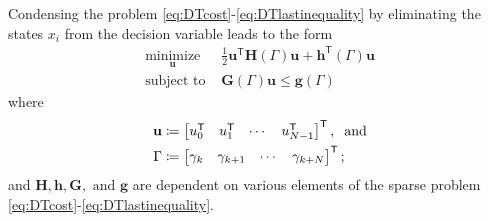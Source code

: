 \documentclass[letterpaper, 10 pt, conference]{ieeeconf}  %
\newcommand{\tran}{^{\mathsf{T}}}
\newcommand{\blkdot}{\tikz\draw[black,fill=black] (0,0) circle (.3ex);}
\begin{document}
Condensing the problem \eqref{eq:DTcost}-\eqref{eq:DTlastinequality} by eliminating the states $x_{i}$ from the decision variable leads to the form
\begin{align}
\underset{\mathbf{u}}{\text{minimize}} & \frac{1}{2}\mathbf{u}\tran \mathbf{H}(\Gamma) \mathbf{u} + \mathbf{h}\tran(\Gamma)\mathbf{u} \label{eq:CondensedCost} \\
\text{subject to } &\mathbf{G}(\Gamma)\mathbf{u} \leq \mathbf{g}(\Gamma) \label{eq:CondensedConstraint}
\end{align}
where
\begin{align*}
\mathbf{u} &\coloneqq \begin{bmatrix} u_0\tran & u_{1}\tran & \cdots & u_{N-1}\tran \end{bmatrix}\tran, \hspace{2mm}\text{and} \\
\Gamma &\coloneqq \begin{bmatrix} \gamma_k & \gamma_{k+1} & \cdots & \gamma_{k+N} \end{bmatrix}\tran; 
\end{align*} 
and $\mathbf{H}, \mathbf{h}, \mathbf{G}, \text{ and } \mathbf{g}$ are dependent on various elements of the sparse problem \eqref{eq:DTcost}-\eqref{eq:DTlastinequality}.
\end{document}
